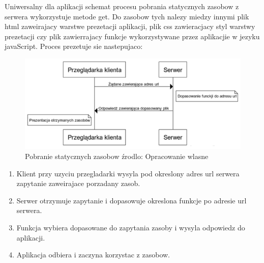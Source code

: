\documentclass[12pt]{report}
\begin{document}
Uniwersalny dla aplikacji schemat procesu pobrania statycznych zasobow z serwera wykorzystuje metode get. Do zasobow tych nalezy miedzy innymi plik html zaweirajacy warstwe prezetacji aplikacji, plik css zawieracjacy styl warstwy prezetacji czy plik zawierrajacy funkcje wykorzystywane przez aplikacjie w jezyku javaScript. Proces prezetuje sie nastepujaco:
\begin{figure}[!hb]
\centering
\includegraphics[width=\textwidth,height=\textheight,keepaspectratio]{K-S.png} 
\caption{Pobranie statycznych zasobow źrodlo: Opracowanie wlasne}
\end{figure}
\begin{enumerate}
\item Klient przy uzyciu przegladarki wysyla pod okreslony adres url serwera zapytanie zaweirajace porzadany zasob.
\item Serwer otrzymuje zapytanie i dopasowuje okreslona funkcje po adresie url serwera.
\item Funkcja wybiera dopasowane do zapytania zasoby i wysyla odpowiedz do aplikacji.
\item Aplikacja odbiera i zaczyna korzystac z zasobow.
\end{enumerate}
\end{document}

